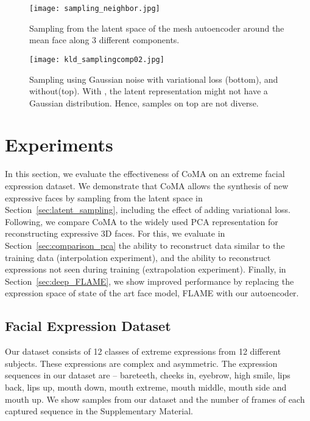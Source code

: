 \begin{figure}[t]
\begin{center}
\texttt{[image: sampling\_neighbor.jpg]}
\end{center}
\caption{Sampling from the latent space of the mesh autoencoder around the mean face  along 3 different components.}
\label{fig:latent_space}
\end{figure}

\begin{figure}[t]
\begin{center}
\texttt{[image: kld\_samplingcomp02.jpg]}
\end{center}
\caption{Sampling using Gaussian noise with variational loss (bottom), and without(top). With , the latent representation might not have a Gaussian distribution. Hence, samples on top are not diverse.}
\label{fig:vae}
\end{figure}

\section{Experiments}
In this section, we evaluate the effectiveness of CoMA on an extreme facial expression dataset. We demonstrate that CoMA allows the synthesis of new expressive faces by sampling from the latent space in Section~\ref{sec:latent_sampling}, including the effect of adding variational loss. Following, we compare CoMA to the widely used PCA representation for reconstructing expressive 3D faces. For this, we evaluate in Section~\ref{sec:comparison_pca} the ability to reconstruct data similar to the training data (interpolation experiment), and the ability to reconstruct expressions not seen during training (extrapolation experiment). Finally, in Section~\ref{sec:deep_FLAME}, we show improved performance by replacing the expression space of state of the art face model, FLAME \cite{FLAME2017} with our autoencoder.


\subsection{Facial Expression Dataset}
Our dataset consists of 12 classes of extreme expressions from 12 different subjects. These expressions are complex and asymmetric. The expression sequences in our dataset are -- bareteeth, cheeks in, eyebrow, high smile, lips back, lips up, mouth down, mouth extreme, mouth middle, mouth side and mouth up. We show samples from our dataset and the number of frames of each captured sequence in the Supplementary Material.

